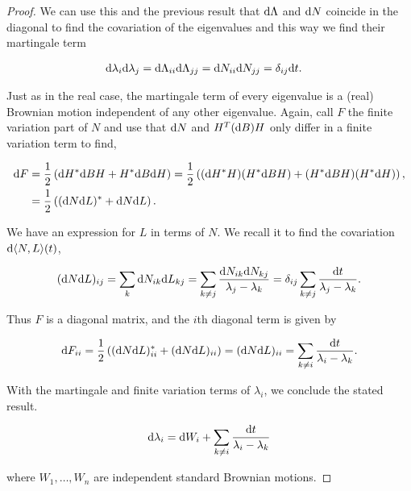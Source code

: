 \begin{proof}
    
    We can use this and the previous result that $\mathrm d \Lambda$ and $\mathrm d N$ coincide in the diagonal to find the covariation of the eigenvalues and this way we find their martingale term
    
    \begin{align*}
        \mathrm d \lambda_i\mathrm d \lambda_j &= \mathrm d \Lambda_{ii} \mathrm d\Lambda_{jj} = \mathrm d N_{ii}\mathrm d N_{jj} = \delta_{ij}\mathrm d t.
    \end{align*}

    Just as in the real case, the martingale term of every eigenvalue is a (real) Brownian motion independent of any other eigenvalue. Again, call $F$ the finite variation part of $N$ and use that $\mathrm d N$ and $H^T (\mathrm d B) H$ only differ in a finite variation term to find,

    \begin{align*}
        \mathrm d F &= \frac12\left( \mathrm d H^* \mathrm d B H + H^* \mathrm d B \mathrm d H \right) = \frac12\left( (\mathrm d H^* H)(H^*\mathrm d B H) + (H^* \mathrm d B H)(H^* \mathrm d H) \right),\\ 
        &= \frac12\left( (\mathrm d N \mathrm d L)^* + \mathrm d N \mathrm d L  \right).
    \end{align*}

    We have an expression for $L$ in terms of $N$. We recall it to find the covariation $\mathrm d \langle N, L\rangle(t)$, 

    \begin{equation*}
        (\mathrm d N \mathrm d L)_{ij} = \sum_{k} \mathrm d N_{ik}\mathrm d L_{kj} = \sum_{k\neq j} \frac{\mathrm d N_{ik}\mathrm d N_{kj}}{\lambda_j - \lambda_k} = \delta_{ij} \sum_{k\neq j} \frac{\mathrm d t}{\lambda_j - \lambda_k}.
    \end{equation*}

    Thus $F$ is a diagonal matrix, and the $i$th diagonal term is given by

    \begin{equation*}
        \mathrm d F_{ii} = \frac12\left( (\mathrm d N \mathrm d L)^*_{ii} + (\mathrm d N \mathrm d L)_{ii}  \right) = (\mathrm d N \mathrm d L)_{ii} = \sum_{k\neq i} \frac{\mathrm d t}{\lambda_i - \lambda_k}.
    \end{equation*}

    With the martingale and finite variation terms of $\lambda_i$, we conclude the stated result.

    \begin{equation*}
        \mathrm d \lambda_i = \mathrm d W_i + \sum_{k\neq i} \frac{\mathrm d t }{\lambda_i - \lambda_k}
    \end{equation*}

    \noindent where $W_1, \dots, W_n$ are independent standard Brownian motions.
\end{proof}










